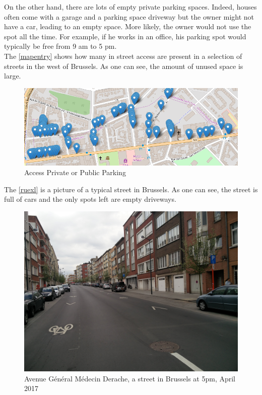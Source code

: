 \documentclass[12pt,a4paper,oneside]{book}
\begin{document}
On the other hand, there are lots of empty private parking spaces. Indeed, houses often come with a garage and a parking space driveway but the owner might not have a car, leading to an empty space. More likely, the owner would not use the spot all the time. For example, if he works in an office, his parking spot would typically be free from 9 am to 5 pm.\\
The \autoref{mapentry} shows how many in street access are present in a selection of streets in the west of Brussels. As one can see, the amount of unused space is large.\\


\begin{figure}[h]
\centering
\caption{Access Private or Public Parking\cite{mapentrysrc}}
\label{mapentry}
\includegraphics[keepaspectratio=true,width=\textwidth-2cm]{images/casestudyander.png}
\end{figure}

The \autoref{ruexl} is a picture of a typical street in Brussels. As one can see, the street is full of cars and the only spots left are empty driveways.

\begin{figure}[h]
\centering
\caption{Avenue Général Médecin Derache, a street in Brussels at 5pm, April 2017}
\label{ruexl}
\includegraphics[keepaspectratio=true,width=\textwidth-2cm]{images/ruexl.jpg}
\end{figure}
\end{document}
